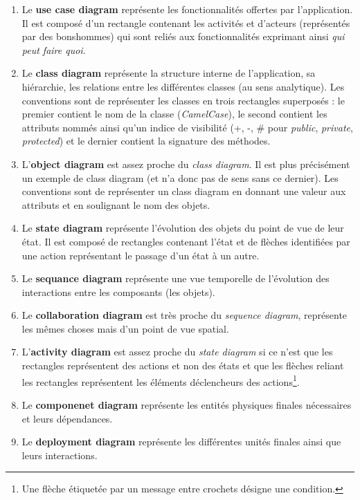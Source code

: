 \documentclass{article}
\begin{document}
		\begin{enumerate}
			\item Le \textbf{use case diagram} représente les fonctionnalités offertes par l'application. Il est composé d'un rectangle contenant les activités et d'acteurs (représentés
				par des bonshommes) qui sont reliés aux fonctionnalités exprimant ainsi \textit{qui peut faire quoi}.
			\item Le \textbf{class diagram} représente la structure interne de l'application, sa hiérarchie, les relations entre les différentes classes (au sens analytique).
				Les conventions sont de représenter les classes en trois rectangles superposés : le premier contient le nom de la classe (\textit{CamelCase}), le second contient
				les attributs nommés ainsi qu'un indice de visibilité (+, -, \# pour \textit{public}, \textit{private}, \textit{protected}) et le dernier contient la signature des méthodes.
			\item L'\textbf{object diagram} est assez proche du \textit{class diagram}. Il est plus précisément un exemple de class diagram (et n'a donc pas de sens sans ce dernier).
				Les conventions sont de représenter un class diagram en donnant une valeur aux attributs et en soulignant le nom des objets.
			\item Le \textbf{state diagram} représente l'évolution des objets du point de vue de leur état. Il est composé de rectangles contenant l'état et de flèches identifiées par
				une action représentant le passage d'un état à un autre.
			\item Le \textbf{sequance diagram} représente une vue temporelle de l'évolution des interactions entre les composants (les objets).
			\item Le \textbf{collaboration diagram} est très proche du \textit{sequence diagram}, représente les mêmes choses mais d'un point de vue spatial.
			\item L'\textbf{activity diagram} est assez proche du \textit{state diagram} si ce n'est que les rectangles représentent des actions et non des états et que les flèches reliant
				les rectangles représentent les éléments déclencheurs des actions\footnote{Une flèche étiquetée par un message entre crochets désigne une condition.}.
			\item Le \textbf{componenet diagram} représente les entités physiques finales nécessaires et leurs dépendances.
			\item Le \textbf{deployment diagram} représente les différentes unités finales ainsi que leurs interactions.
		\end{enumerate}
\end{document}
